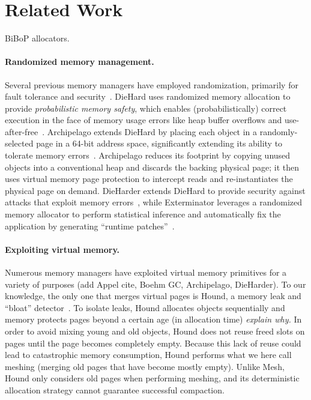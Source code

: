 \section{Related Work}
\label{sec:related}

BiBoP allocators.

\paragraph{Randomized memory management.} Several previous memory managers have employed randomization,
primarily for fault tolerance and
security~\cite{Novark:2010:DSH:1866307.1866371, 1134000, 1346296,
  1250736}. DieHard uses randomized memory allocation to provide
\emph{probabilistic memory safety}, which enables (probabilistically)
correct execution in the face of memory usage errors like heap buffer
overflows and use-after-free~\cite{1134000}. Archipelago extends
DieHard by placing each object in a randomly-selected page in a 64-bit
address space, significantly extending its ability to tolerate memory
errors~\cite{1346296}. Archipelago reduces its footprint by copying
unused objects into a conventional heap and discards the backing
physical page; it then uses virtual memory page protection to
intercept reads and re-instantiates the physical page on
demand. DieHarder extends DieHard to provide security against attacks
that exploit memory errors~\cite{Novark:2010:DSH:1866307.1866371},
while Exterminator leverages a randomized memory allocator to perform
statistical inference and automatically fix the application by
generating ``runtime patches''~\cite{1250736}.

\paragraph{Exploiting virtual memory.} Numerous memory managers have
exploited virtual memory primitives for a variety of purposes (add
Appel cite, Boehm GC, Archipelago, DieHarder). To our knowledge, the
only one that merges virtual pages is Hound, a memory leak and
``bloat'' detector~\cite{1542521}. To isolate leaks, Hound allocates
objects sequentially and memory protects pages beyond a certain age
(in allocation time) \emph{explain why.} In order to avoid mixing
young and old objects, Hound does not reuse freed slots on pages until
the page becomes completely empty. Because this lack of reuse could
lead to catastrophic memory consumption, Hound performs what we here
call meshing (merging old pages that have become mostly empty). Unlike
Mesh, Hound only considers old pages when performing meshing, and its
deterministic allocation strategy cannot guarantee successful
compaction.
